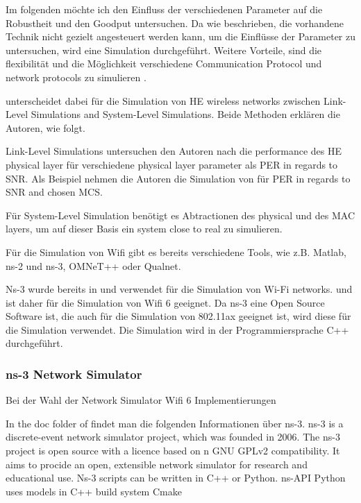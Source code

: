 \documentclass[]{nsm-thesis}
\begin{document}

Im folgenden möchte ich den Einfluss der verschiedenen Parameter auf die Robustheit und den Goodput untersuchen. Da wie beschrieben, die vorhandene Technik nicht
gezielt angesteuert werden kann, um die Einflüsse der Parameter zu untersuchen, wird eine Simulation durchgeführt. Weitere Vorteile, sind die flexibilität und die
Möglichkeit verschiedene Communication Protocol und network protocols zu simulieren \cite{ComparativeStudyKumar}.

\textcite{OmarHESurvey} unterscheidet dabei für die Simulation von HE wireless networks zwischen Link-Level Simulations and System-Level Simulations. Beide Methoden erklären die Autoren, wie folgt.

Link-Level Simulations untersuchen den Autoren nach die performance des HE physical layer für verschiedene physical layer parameter als \ac{PER} in regards to \ac{SNR}. Als Beispiel nehmen die Autoren die Simulation von \textcite{201} für PER in regards to SNR and chosen MCS.

Für System-Level Simulation benötigt es Abtractionen des physical und des MAC layers, um auf dieser Basis ein system close to real zu simulieren.

Für die Simulation von Wifi gibt es bereits verschiedene Tools, wie z.B. Matlab, ns-2 und ns-3, OMNeT++ oder Qualnet.

\cite{SimulationWifiMesh}
Ns-3 wurde bereits in \cite{ComparativeStudyKumar} und \cite{SimulationWifiMesh} verwendet für die Simulation von Wi-Fi networks. \textcite{} und ist daher für die Simulation von Wifi 6 geeignet.
Da ns-3 eine Open Source Software ist, die auch für die
Simulation von 802.11ax geeignet ist, wird diese für die Simulation verwendet. Die Simulation wird in der Programmiersprache C++ durchgeführt.


 
\subsubsection*{ns-3 Network Simulator}

Bei der Wahl der Network Simulator Wifi 6 Implementierungen 



In the doc folder of  \cite{noauthor_files_nodate} findet man die folgenden Informationen über ns-3.
ns-3 is a discrete-event network simulator project, which was founded in 2006.
The ns-3 project is open source with a licence based on n GNU GPLv2 compatibility.
It aims to procide an open, extensible network simulator for research and educational use. Ns-3 scripts can be written in C++ or Python.
ns-API Python uses models in C++
build system Cmake
\end{document}
